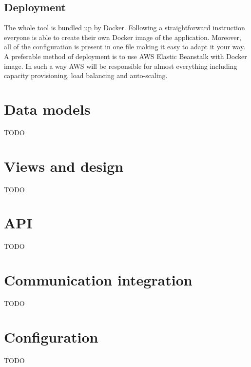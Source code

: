 \documentclass[licencjacka,en]{thesisclass}
\begin{document}
    \subsection{Deployment}

    The whole tool is bundled up by Docker.
    Following a straightforward instruction everyone is able to create their own Docker image of the application.
    Moreover, all of the configuration is present in one file making it easy to adapt it your way.
    A preferable method of deployment is to use AWS Elastic Beanstalk with Docker image.
    In such a way AWS will be responsible for almost everything including capacity provisioning, load balancing and auto-scaling.

    \section{Data models}
    TODO
    \section{Views and design}
    TODO
    \section{API}
    TODO
    \section{Communication integration}
    TODO
    \section{Configuration}
    TODO
\end{document}
